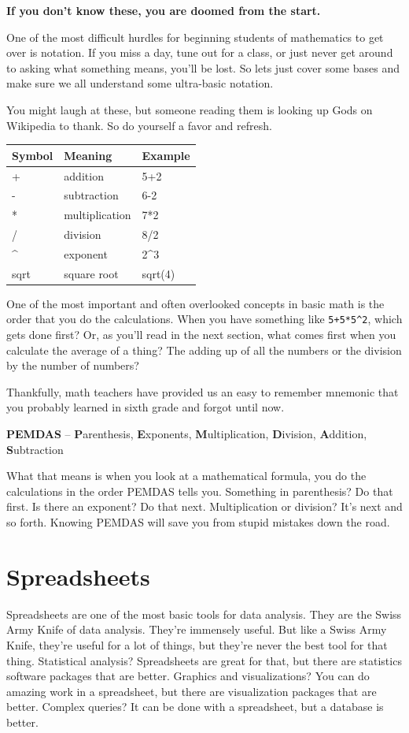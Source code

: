 \documentclass[]{book}
\begin{document}
\textbf{If you don't know these, you are doomed from the start.}

One of the most difficult hurdles for beginning students of mathematics to get over is notation. If you miss a day, tune out for a class, or just never get around to asking what something means, you'll be lost. So lets just cover some bases and make sure we all understand some ultra-basic notation.

You might laugh at these, but someone reading them is looking up Gods on Wikipedia to thank. So do yourself a favor and refresh.

\begin{longtable}[]{@{}lll@{}}
\toprule
Symbol & Meaning & Example\tabularnewline
\midrule
\endhead
+ & addition & 5+2\tabularnewline
- & subtraction & 6-2\tabularnewline
* & multiplication & 7*2\tabularnewline
/ & division & 8/2\tabularnewline
\^{} & exponent & 2\^{}3\tabularnewline
sqrt & square root & sqrt(4)\tabularnewline
\bottomrule
\end{longtable}

One of the most important and often overlooked concepts in basic math is the order that you do the calculations. When you have something like \texttt{5+5*5\^{}2}, which gets done first? Or, as you'll read in the next section, what comes first when you calculate the average of a thing? The adding up of all the numbers or the division by the number of numbers?

Thankfully, math teachers have provided us an easy to remember mnemonic that you probably learned in sixth grade and forgot until now.

\textbf{PEMDAS} -- \textbf{P}arenthesis, \textbf{E}xponents, \textbf{M}ultiplication, \textbf{D}ivision, \textbf{A}ddition, \textbf{S}ubtraction

What that means is when you look at a mathematical formula, you do the calculations in the order PEMDAS tells you. Something in parenthesis? Do that first. Is there an exponent? Do that next. Multiplication or division? It's next and so forth. Knowing PEMDAS will save you from stupid mistakes down the road.

\hypertarget{spreadsheets}{%
\section{Spreadsheets}\label{spreadsheets}}

Spreadsheets are one of the most basic tools for data analysis. They are the Swiss Army Knife of data analysis. They're immensely useful. But like a Swiss Army Knife, they're useful for a lot of things, but they're never the best tool for that thing. Statistical analysis? Spreadsheets are great for that, but there are statistics software packages that are better. Graphics and visualizations? You can do amazing work in a spreadsheet, but there are visualization packages that are better. Complex queries? It can be done with a spreadsheet, but a database is better.
\end{document}
